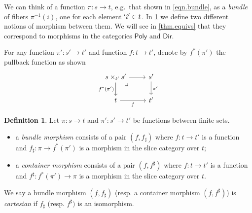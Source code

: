 \documentclass[11pt, article, one side]{memoir}
\theoremstyle{theorem}
\theoremstyle{definition}
\newtheorem{definition}[section]{Definition}
\theoremstyle{remark}
\newcommand{\Cat}[1]{\mathsf{#1}}%
\newcommand{\inv}{^{-1}}
\newcommand{\cont}{\Cat{Cont}}
\newcommand{\bun}{\Cat{Bun}}
\newcommand{\poly}{\Cat{Poly}}
\newcommand{\dir}{\Cat{Dir}}
\begin{document}
We can think of a function $\pi\colon s\to t$, e.g.\ that shown in \eqref{eqn.bundle}, as a \emph{bundle} of fibers $\pi\inv(i)$, one for each element $`i'\in t$. In \cref{def.sheaves_bundles} we define two different notions of morphism between them. We will see in \cref{thm.equivs} that they correspond to morphisms in the categories $\poly$ and $\dir$.

For any function $\pi'\colon s'\to t'$ and function $f\colon t\to t'$, denote by $f^*(\pi')$ the pullback function as shown
\[
\begin{tikzcd}
	s\times_{t'}s'\ar[r]\ar[d, "f^*(\pi')"']&
	s'\ar[d, "\pi'"]\\
	t\ar[r, "f"']&
	t'\ar[ul, phantom, very near end, "\lrcorner"]
\end{tikzcd}
\]

\begin{definition}\label{def.sheaves_bundles}
Let $\pi\colon s\to t$ and $\pi'\colon s'\to t'$ be functions between finite sets.
\begin{itemize}
	\item a \emph{bundle morphism} consists of a pair $(f,f_\sharp)$ where $f\colon t\to t'$ is a function and $f_\sharp\colon \pi\to f^*(\pi')$ is a morphism in the slice category over $t$;
	\item a \emph{container morphism} consists of a pair $(f,f^\sharp)$ where $f\colon t\to t'$ is a function and $f^\sharp\colon f^*(\pi')\to \pi$ is a morphism in the slice category over $t$.
\end{itemize}

We say a bundle morphism $(f, f_\sharp)$ (resp. a container morphism $(f, f^{\sharp})$) is \emph{cartesian} if $f_{\sharp}$ (resp. $f^{\sharp})$ is an isomorphism.


\end{definition}
\end{document}
